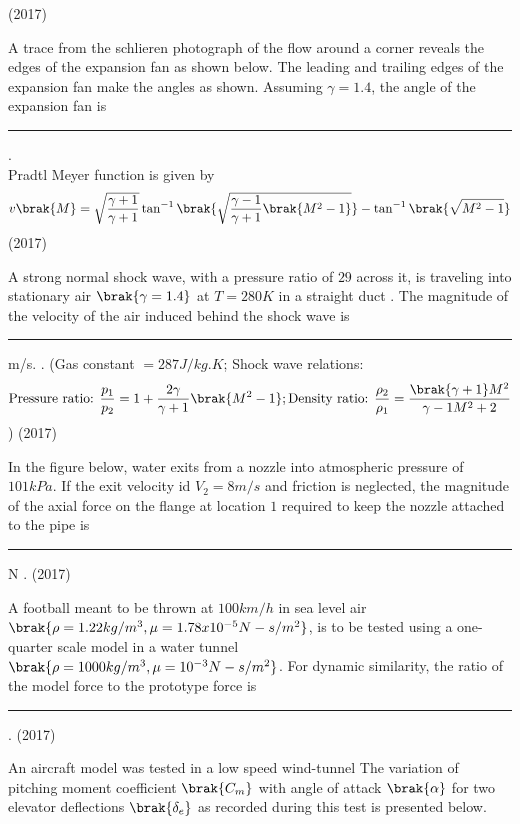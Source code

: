 	\hfill{(2017)}
	\item A trace from the schlieren photograph of the flow around a corner reveals the edges of the expansion fan as shown below. The leading and trailing edges of the expansion fan make the angles as shown. Assuming $\gamma=1.4$, the angle of the expansion fan  is  \rule{1cm}{0.15mm} .\\
    Pradtl Meyer function is given by 
    \begin{align*}
        v\brak{M}=\sqrt{\frac{\gamma +1}{\gamma +1}}\tan^{-1}\brak{\sqrt{\frac{\gamma -1}{\gamma +1}\brak{M^2-1}}}-\tan^{-1}\brak{\sqrt{M^2-1}}
    \end{align*}
    \hfill{(2017)}
    
	\item A strong normal shock wave, with a pressure ratio of $29$ across it, is traveling into stationary air $\brak{\gamma = 1.4}$ at $T=280K$ in a straight duct . The magnitude of the velocity of the air induced behind the shock wave is \rule{1cm}{0.15mm} m/s. .
    (Gas constant $=287J/kg.K$; Shock wave relations:
    \begin{align*}
        \text{Pressure ratio: } \frac{p_1}{p_2}=1+\frac{2\gamma}{\gamma+1}\brak{M^2-1}; \text{Density ratio: } \frac{\rho_2}{\rho_1}=\frac{\brak{\gamma+1}M^2}{\gamma-1M^2+2}
    \end{align*})
    \hfill{(2017)}
  
	\item In the figure below,  water exits from  a nozzle into atmospheric pressure of $101 kPa$. If the exit velocity id $V_2=8m/s$ and friction is neglected,  the magnitude of the axial force on the flange at location $1$ required to keep the nozzle attached to the pipe is \rule{1cm}{0.15mm}N .
	\hfill{(2017)}
 
	\item  A football meant to be thrown at $100km/h$ in sea level air $\brak{\rho = 1.22 kg/m^3,\mu =1.78x10^{-5}N-s/m^2}$, is to be tested using a one-quarter scale model in a water tunnel $\brak{\rho =1000kg/m^3,\mu=10^{-3}N-s/m^2}$. For dynamic similarity, the ratio of the model force to the prototype force is \rule{1cm}{0.15mm} .
	\hfill{(2017)}
	\item An aircraft model was tested in a low speed wind-tunnel  The variation of pitching moment coefficient $\brak{C_m}$ with angle of attack $\brak{\alpha}$ for two elevator deflections $\brak{\delta_e}$ as recorded during this test is presented below.
